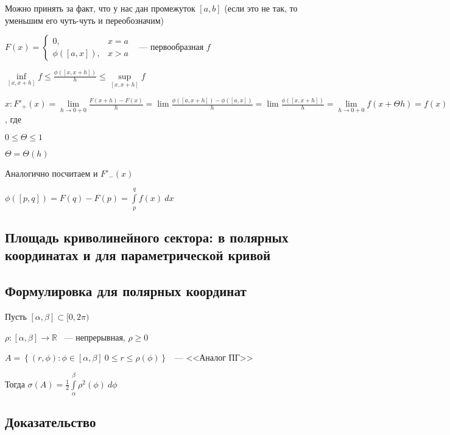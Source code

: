 \documentclass[../main.tex]{subfiles}
\begin{document}
            Можно принять за факт, что у нас дан промежуток $[a, b]$ (если это не так, то уменьшим его чуть-чуть и переобозначим)
            
            $F(x) = \begin{cases} 0{,} & x = a \\ \phi([a, x]){,} & x > a \end{cases}$ ~--- первообразная $f$
            
            $\inf\limits_{[x, x + h]} f \leq \frac{\phi([x, x + h])}{h} \leq \sup\limits_{[x, x + h]} f$
            
            $x : F'_+(x) = \lim\limits_{h \rightarrow 0 + 0} \frac{F(x + h) - F(x)}{h} = \lim \frac{\phi([a, x + h]) - \phi([a, x])}{h} = \lim \frac{\phi([x, x + h])}{h} = \lim\limits_{h \rightarrow 0 + 0} f(x + \Theta h) = f(x)$, где
            
            $0 \leq \Theta \leq 1$
            
            $\Theta = \Theta(h)$
            
            Аналогично посчитаем и $F'_-(x)$
            
            $\phi([p, q]) = F(q) - F(p) = \int\limits^q_p f(x) \ dx$
\newpage


\subsection{Площадь криволинейного сектора: в полярных координатах и для параметрической кривой}
\subsection*{Формулировка для полярных координат}
            
            Пусть $[\alpha, \beta] \subset [0, 2 \pi)$
            
            $\rho : [\alpha, \beta] \rightarrow \mathbb{R}$ ~--- непрерывная, $\rho \geq 0$
            
            $A = \left\{ (r, \phi) : \phi \in [\alpha, \beta] \ 0 \leq r \leq \rho(\phi) \right\}$ ~--- <<Аналог ПГ>>
            
            Тогда $\sigma(A) = \frac{1}{2} \int\limits^{\beta}_{\alpha} \rho^2(\phi) \ d \phi$
            
        \subsection*{Доказательство}
        
\end{document}
